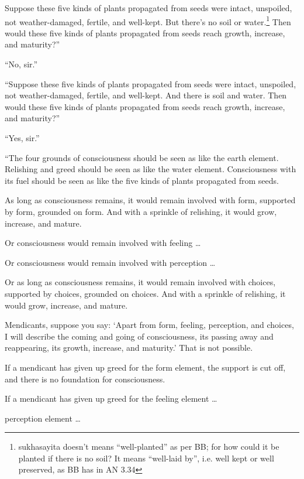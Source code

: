 \documentclass[12pt,openany]{book}%
\begin{document}
Suppose these five kinds of plants propagated from seeds were intact, unspoiled, not weather-damaged, fertile, and well-kept. But there’s no soil or water.\footnote{sukhasayita doesn’t means “well-planted” as per BB; for how could it be planted if there is no soil? It means “well-laid by”, i.e. well kept or well preserved, as BB has in AN 3.34 } Then would these five kinds of plants propagated from seeds reach growth, increase, and maturity?” 

“No, sir.” 

“Suppose these five kinds of plants propagated from seeds were intact, unspoiled, not weather-damaged, fertile, and well-kept. And there is soil and water. Then would these five kinds of plants propagated from seeds reach growth, increase, and maturity?” 

“Yes, sir.” 

“The four grounds of consciousness should be seen as like the earth element. Relishing and greed should be seen as like the water element. Consciousness with its fuel should be seen as like the five kinds of plants propagated from seeds. 

As long as consciousness remains, it would remain involved with form, supported by form, grounded on form. And with a sprinkle of relishing, it would grow, increase, and mature. 

Or consciousness would remain involved with feeling … 

Or consciousness would remain involved with perception … 

Or as long as consciousness remains, it would remain involved with choices, supported by choices, grounded on choices. And with a sprinkle of relishing, it would grow, increase, and mature. 

Mendicants, suppose you say: ‘Apart from form, feeling, perception, and choices, I will describe the coming and going of consciousness, its passing away and reappearing, its growth, increase, and maturity.’ That is not possible. 

If a mendicant has given up greed for the form element, the support is cut off, and there is no foundation for consciousness. 

If a mendicant has given up greed for the feeling element … 

perception element … 
\end{document}
